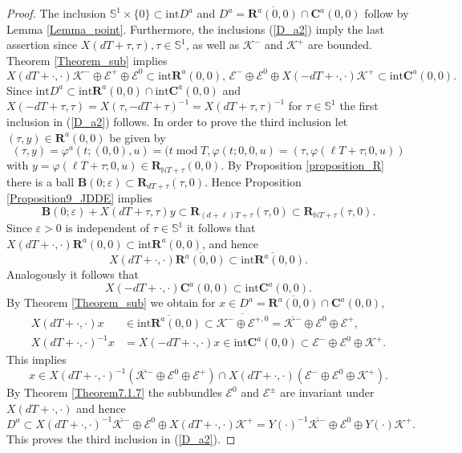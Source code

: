 \documentclass{siamltex}%
\begin{document}
\begin{proof}
The inclusion $\mathbb{S}^{1}\times\{0\}\subset\mathrm{int}D^{a}$ and
$D^{a}=\overline{\mathbf{R}^{a}(0,0)}\cap\mathbf{C}^{a}(0,0)$ follow by Lemma
\ref{Lemma_point}. Furthermore, the inclusions (\ref{D_a2}) imply the last
assertion since $X(dT+\tau,\tau),\tau\in\mathbb{S}^{1}$, as well as
$\mathcal{K}^{-}$ and $\mathcal{K}^{+}$ are bounded. Theorem \ref{Theorem_sub}
implies%
\[
X(dT+\cdot,\cdot)\mathcal{K}^{-}\oplus\mathcal{E}^{+}\oplus\mathcal{E}%
^{0}\subset\mathrm{int}\mathbf{R}^{a}(0,0),\,\mathcal{E}^{-}\oplus
\mathcal{E}^{0}\oplus X(-dT+\cdot,\cdot)\mathcal{K}^{+}\subset\mathrm{int}%
\mathbf{C}^{a}(0,0).
\]
Since $\mathrm{int}D^{a}\subset\mathrm{int}\mathbf{R}^{a}(0,0)\cap
\mathrm{int}\mathbf{C}^{a}(0,0)$ and $X(-dT+\tau,\tau)=X(\tau,-dT+\tau
)^{-1}=X(dT+\tau,\tau)^{-1}$ for $\tau\in\mathbb{S}^{1}$ the first inclusion
in (\ref{D_a2}) follows. In order to prove the third inclusion let
$(\tau,y)\in\mathbf{R}^{a}(0,0)$ be given by%
\[
(\tau,y)=\varphi^{a}(t;(0,0),u)=(t\operatorname{mod}T,\varphi(t;0,0,u)=(\tau
,\varphi(\ell T+\tau;0,u))
\]
with $y=\varphi(\ell T+\tau;0,u)\in\mathbf{R}_{\mathbb{N}T+\tau}(0,0)$. By
Proposition \ref{proposition_R} there is a ball $\mathbf{B}(0;\varepsilon
)\subset\mathbf{R}_{dT+\tau}(\tau,0)$. Hence Proposition
\ref{Proposition9_JDDE} implies%
\[
\mathbf{B}(0;\varepsilon)+X(dT+\tau,\tau)y\subset\mathbf{R}_{(d+\ell)T+\tau
}(\tau,0)\subset\mathbf{R}_{\mathbb{N}T+\tau}(\tau,0).
\]
Since $\varepsilon>0$ is independent of $\tau\in\mathbb{S}^{1}$ it follows
that $X(dT+\cdot,\cdot)\mathbf{R}^{a}(0,0)\subset\mathrm{int}\mathbf{R}%
^{a}(0,0)$, and hence%
\[
X(dT+\cdot,\cdot)\overline{\mathbf{R}^{a}(0,0)}\subset\overline{\mathrm{int}%
\mathbf{R}^{a}(0,0)}.
\]
Analogously it follows that%
\[
X(-dT+\cdot,\cdot)\mathbf{C}^{a}(0,0)\subset\mathrm{int}\mathbf{C}^{a}(0,0).
\]
By Theorem \ref{Theorem_sub} we obtain for $x\in D^{a}=\overline
{\mathbf{R}^{a}(0,0)}\cap\mathbf{C}^{a}(0,0)$,%
\begin{align*}
X(dT+\cdot,\cdot)x  &  \in\overline{\mathrm{int}\mathbf{R}^{a}(0,0)}%
\subset\overline{\mathcal{K}^{-}\oplus\mathcal{E}^{+,0}}=\overline
{\mathcal{K}^{-}}\oplus\mathcal{E}^{0}\oplus\mathcal{E}^{+},\\
X(dT+\cdot,\cdot)^{-1}x  &  =X(-dT+\cdot,\cdot)x\in\mathrm{int}\mathbf{C}%
^{a}(0,0)\subset\mathcal{E}^{-}\oplus\mathcal{E}^{0}\oplus\mathcal{K}^{+}.
\end{align*}
This implies%
\[
x\in X(dT+\cdot,\cdot)^{-1}\left(  \overline{\mathcal{K}^{-}}\oplus
\mathcal{E}^{0}\oplus\mathcal{E}^{+}\right)  \cap X(dT+\cdot,\cdot)\left(
\mathcal{E}^{-}\oplus\mathcal{E}^{0}\oplus\mathcal{K}^{+}\right)  .
\]
By Theorem \ref{Theorem7.1.7} the subbundles $\mathcal{E}^{0}$ and
$\mathcal{E}^{\pm}$ are invariant under $X(dT+\cdot,\cdot)$ and hence%
\[
D^{a}\subset X(dT+\cdot,\cdot)^{-1}\overline{\mathcal{K}^{-}}\oplus
\mathcal{E}^{0}\oplus X(dT+\cdot,\cdot)\mathcal{K}^{+}=Y(\cdot)^{-1}%
\overline{\mathcal{K}^{-}}\oplus\mathcal{E}^{0}\oplus Y(\cdot)\mathcal{K}%
^{+}.
\]
This proves the third inclusion in (\ref{D_a2}).


\end{proof}
\end{document}
